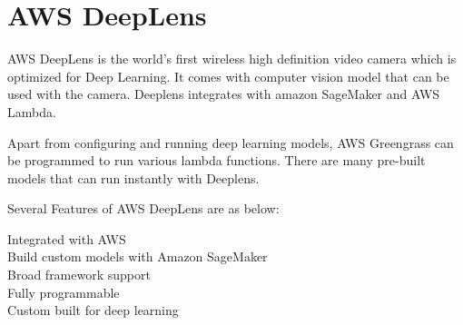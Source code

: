 \section{AWS DeepLens}

AWS DeepLens is the world's first wireless high definition video
camera which is optimized for Deep Learning. It comes with
computer vision model that can be used with the camera. Deeplens
integrates with amazon SageMaker and AWS Lambda.

Apart from configuring and running deep learning models, AWS
Greengrass can be programmed to run various lambda functions.
There are many pre-built models that can run instantly with
Deeplens.~\cite{hid-sp18-522-deeplens}


Several Features of AWS DeepLens are as below: 

\begin{description}
	\item[Integrated with AWS]
	\item[Build custom models with Amazon SageMaker]
	\item[Broad framework support]
	\item[Fully programmable]
	\item[Custom built for deep learning]	
\end{description}
